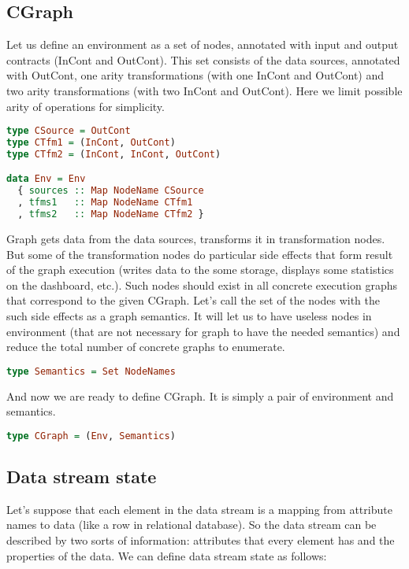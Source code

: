 \subsection{CGraph}

Let us define an environment as a set of nodes, annotated with input and output contracts (InCont and OutCont).
This set consists of the data sources, annotated with OutCont, one arity transformations (with one InCont and OutCont) and two arity transformations (with two InCont and OutCont).
Here we limit possible arity of operations for simplicity.

\begin{lstlisting}[language=Haskell]
type CSource = OutCont
type CTfm1 = (InCont, OutCont)
type CTfm2 = (InCont, InCont, OutCont)

data Env = Env
  { sources :: Map NodeName CSource
  , tfms1   :: Map NodeName CTfm1
  , tfms2   :: Map NodeName CTfm2 }
\end{lstlisting}

Graph gets data from the data sources, transforms it in transformation nodes.
But some of the transformation nodes do particular side effects that form result of the graph execution (writes data to the some storage, displays some statistics on the dashboard, etc.).
Such nodes should exist in all concrete execution graphs that correspond to the given CGraph.
Let's call the set of the nodes with the such side effects as a graph semantics.
It will let us to have useless nodes in environment (that are not necessary for graph to have the needed semantics) and reduce the total number of concrete graphs to enumerate.

\begin{lstlisting}[language=Haskell]
type Semantics = Set NodeNames
\end{lstlisting}

And now we are ready to define CGraph.
It is simply a pair of environment and semantics.

\begin{lstlisting}[language=Haskell]
type CGraph = (Env, Semantics)
\end{lstlisting}

\subsection{Data stream state}

Let's suppose that each element in the data stream is a mapping from attribute names to data (like a row in relational database).
So the data stream can be described by two sorts of information: attributes that every element has and the properties of the data.
We can define data stream state as follows:

